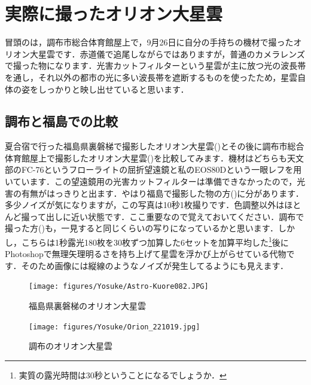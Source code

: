 \documentclass[../../super_nova_2023]{subfiles}
\begin{document}
\section{実際に撮ったオリオン大星雲}
冒頭のは，調布市総合体育館屋上で，9月26日に自分の手持ちの機材で撮ったオリオン大星雲です．赤道儀で追尾しながらではありますが，普通のカメラレンズで撮った物になります．光害カットフィルターという星雲が主に放つ光の波長帯を通し，それ以外の都市の光に多い波長帯を遮断するものを使ったため，星雲自体の姿をしっかりと映し出せていると思います．

\subsection{調布と福島での比較}
夏合宿で行った福島県裏磐梯で撮影したオリオン大星雲()とその後に調布市総合体育館屋上で撮影したオリオン大星雲()を比較してみます．機材はどちらも天文部のFC-76というフローライトの屈折望遠鏡と私のEOS80Dという一眼レフを用いています．この望遠鏡用の光害カットフィルターは準備できなかったので，光害の有無がはっきりと出ます．やはり福島で撮影した物の方()に分があります．多少ノイズが気になりますが，この写真は10秒1枚撮りです．色調整以外はほとんど撮って出しに近い状態です．ここ重要なので覚えておいてください．調布で撮った方()も，一見すると同じくらいの写りになっているかと思います．しかし，こちらは1秒露光180枚を30枚ずつ加算した6セットを加算平均した\footnote{実質の露光時間は30秒ということになるでしょうか．}後にPhotoshopで無理矢理明るさを持ち上げて星雲を浮かび上がらせている代物です．そのため画像には縦線のようなノイズが発生してるようにも見えます．
\begin{figure}[H]
	\centering
	\begin{minipage}{0.4\columnwidth}
		\centering
		\vspace{3.7mm}
		\texttt{[image: figures/Yosuke/Astro-Kuore082.JPG]}
		\vspace{-1.5\zw}
		\caption{福島県裏磐梯のオリオン大星雲}
		\label{fig:FukushimaOrion}
	\end{minipage}
	\begin{minipage}{0.4\columnwidth}
		\centering
		\texttt{[image: figures/Yosuke/Orion\_221019.jpg]}
		\caption{調布のオリオン大星雲}
		\label{fig:ChofuOrion}
	\end{minipage}
\end{figure}
\end{document}
